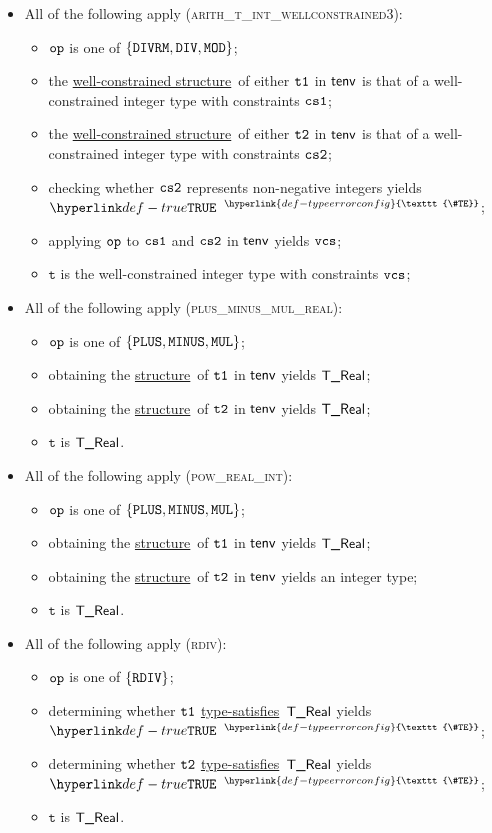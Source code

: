 \documentclass{book}
\newcommand\TypeErrorConfig[0]{\hyperlink{def-typeerrorconfig}{\texttt{\#TE}}}
\newcommand\ProseOrTypeError[0]{\hyperlink{def-proseortypeerror}{$^{\TypeErrorConfig}$}}
\newcommand\structure[0]{\hyperlink{def-structure}{structure}}
\newcommand\typesatisfies[0]{\hyperlink{def-typesatisfies}{type-satisfies}}
\newcommand\wellconstrainedstructure[0]{\hyperlink{def-getwellconstrainedstructure}{well-constrained structure}}
\newcommand\vt[0]{\texttt{t}}
\begin{document}
\begin{itemize}
  \item All of the following apply (\textsc{arith\_t\_int\_wellconstrained3}):
  \begin{itemize}
    \item $\texttt{op}$ is one of $\{\texttt{DIVRM}, \texttt{DIV}, \texttt{MOD}\}$;
    \item the \wellconstrainedstructure\ of either $\texttt{t1}$ in $\textsf{tenv}$ is that of a well-constrained integer type with
          constraints $\texttt{cs1}$;
          \item the \wellconstrainedstructure\ of either $\texttt{t2}$ in $\textsf{tenv}$ is that of a well-constrained integer type with
          constraints $\texttt{cs2}$;
    \item checking whether $\texttt{cs2}$ represents non-negative integers yields $\True$ \ProseOrTypeError;
    \item applying $\texttt{op}$ to $\texttt{cs1}$ and $\texttt{cs2}$ in $\textsf{tenv}$ yields $\texttt{vcs}$;
    \item $\vt$ is the well-constrained integer type with constraints $\texttt{vcs}$;
  \end{itemize}

  \item All of the following apply (\textsc{plus\_minus\_mul\_real}):
  \begin{itemize}
    \item $\texttt{op}$ is one of $\{\texttt{PLUS}, \texttt{MINUS}, \texttt{MUL}\}$;
    \item obtaining the \structure\ of $\texttt{t1}$ in $\textsf{tenv}$ yields $\textsf{T\_Real}$;
    \item obtaining the \structure\ of $\texttt{t2}$ in $\textsf{tenv}$ yields $\textsf{T\_Real}$;
    \item $\vt$ is $\textsf{T\_Real}$.
  \end{itemize}

  \item All of the following apply (\textsc{pow\_real\_int}):
  \begin{itemize}
    \item $\texttt{op}$ is one of $\{\texttt{PLUS}, \texttt{MINUS}, \texttt{MUL}\}$;
    \item obtaining the \structure\ of $\texttt{t1}$ in $\textsf{tenv}$ yields $\textsf{T\_Real}$;
    \item obtaining the \structure\ of $\texttt{t2}$ in $\textsf{tenv}$ yields an integer type;
    \item $\vt$ is $\textsf{T\_Real}$.
  \end{itemize}

  \item All of the following apply (\textsc{rdiv}):
  \begin{itemize}
    \item $\texttt{op}$ is one of $\{\texttt{RDIV}\}$;
    \item determining whether $\texttt{t1}$ \typesatisfies\ $\textsf{T\_Real}$ yields $\True$ \ProseOrTypeError;
    \item determining whether $\texttt{t2}$ \typesatisfies\ $\textsf{T\_Real}$ yields $\True$ \ProseOrTypeError;
    \item $\vt$ is $\textsf{T\_Real}$.
  \end{itemize}
\end{itemize}
\end{document}
